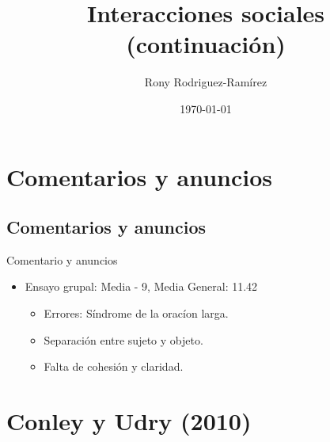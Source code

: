 \documentclass[11pt, aspectratio=169, compress]{beamer}
\title{Interacciones sociales (continuación)}
\author{Rony Rodriguez-Ramírez}
\institute{Economía Social y Humana | Grupo B018 \\Universidad Centroamericana}
\date{\today}
\begin{document}
	
\begin{frame}[plain]
	\maketitle  
\end{frame}

\section{Comentarios y anuncios}
\subsection{Comentarios y anuncios}
\begin{frame}{Comentario y anuncios}
\begin{itemize}
	\item Ensayo grupal: Media - 9, Media General: 11.42
	\begin{itemize}
		\item Errores: Síndrome de la oracíon larga. 
		\item Separación entre sujeto y objeto. 
		\item Falta de cohesión y claridad. 
	\end{itemize}
\end{itemize}
\end{frame}
\section{Conley y Udry (2010)}
\end{document}
